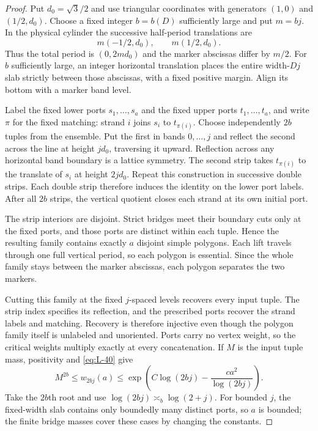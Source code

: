 \begin{proof}
Put $d_0=\sqrt3/2$ and use triangular coordinates with generators
$(1,0)$ and $(1/2,d_0)$. Choose a fixed integer $b=b(D)$ sufficiently
large and put $m=bj$. In the physical cylinder the successive half-period
translations are
\[
 m(-1/2,d_0),\qquad m(1/2,d_0).
\]
Thus the total period is $(0,2md_0)$ and the marker abscissas differ
by $m/2$. For $b$ sufficiently large, an integer horizontal translation
places the entire width-$Dj$ slab strictly between those abscissas,
with a fixed positive margin. Align its bottom with a marker band level.

Label the fixed lower ports $s_1,\ldots,s_a$ and the fixed upper
ports $t_1,\ldots,t_a$, and write $\pi$ for the fixed matching:
strand $i$ joins $s_i$ to $t_{\pi(i)}$. Choose independently $2b$
tuples from the ensemble. Put the first in bands $0,\ldots,j$ and
reflect the second across the line at height $jd_0$, traversing it
upward. Reflection across any horizontal band boundary is a lattice
symmetry. The second strip takes $t_{\pi(i)}$ to the translate of
$s_i$ at height $2jd_0$. Repeat this construction in successive double
strips. Each double strip therefore induces the identity on the lower
port labels. After all $2b$ strips, the vertical quotient closes each
strand at its own initial port.

The strip interiors are disjoint. Strict bridges meet their boundary
cuts only at the fixed ports, and those ports are distinct within each
tuple. Hence the resulting family contains exactly $a$ disjoint simple
polygons. Each lift travels through one full vertical period, so each
polygon is essential. Since the whole family stays between the marker
abscissas, each polygon separates the two markers.

Cutting this family at the fixed $j$-spaced levels recovers every input
tuple. The strip index specifies its reflection, and the prescribed
ports recover the strand labels and matching. Recovery is therefore
injective even though the polygon family itself is unlabeled and
unoriented. Ports carry no vertex weight, so the critical weights
multiply exactly at every concatenation. If $M$ is the input tuple
mass, positivity and \eqref{eq:L-40} give
\[
 M^{2b}\le w_{2bj}(a)
 \le\exp\!\left(C\log(2bj)-\frac{ca^2}{\log(2bj)}\right).
\]
Take the $2b$th root and use
$\log(2bj)\asymp_b\log(2+j)$. For bounded $j$, the fixed-width slab
contains only boundedly many distinct ports, so $a$ is bounded;
the finite bridge masses cover these cases by changing the constants.
\end{proof}

